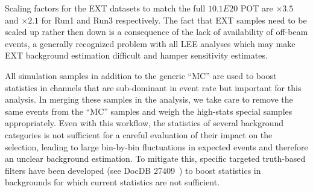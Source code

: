 \documentclass[a4paper]{article}
\begin{document}
Scaling factors for the EXT datasets to match the full $10.1E20$ POT are $\times3.5$ and $\times2.1$ for Run1 and Run3 respectively. The fact that EXT samples need to be scaled up rather then down is a consequence of the lack of availability of off-beam events, a generally recognized problem with all LEE analyses which may make EXT background estimation difficult and hamper sensitivity estimates.
\par %
All simulation samples in addition to the generic ``MC'' are used to boost statistics in channels that are sub-dominant in event rate but important for this analysis. In merging these samples in the analysis, we take care to remove the same events from the ``MC'' samples and weigh the high-stats special samples appropriately. 
Even with this workflow, the statistics of several background categories is not sufficient for a careful evaluation of their impact on the selection, leading to large bin-by-bin fluctuations in expected events and therefore an unclear background estimation. To mitigate this, specific targeted truth-based filters have been developed (see DocDB 27409~\cite{bib:truthfilters}) to boost statistics in backgrounds for which current statistics are not sufficient. 
\end{document}
